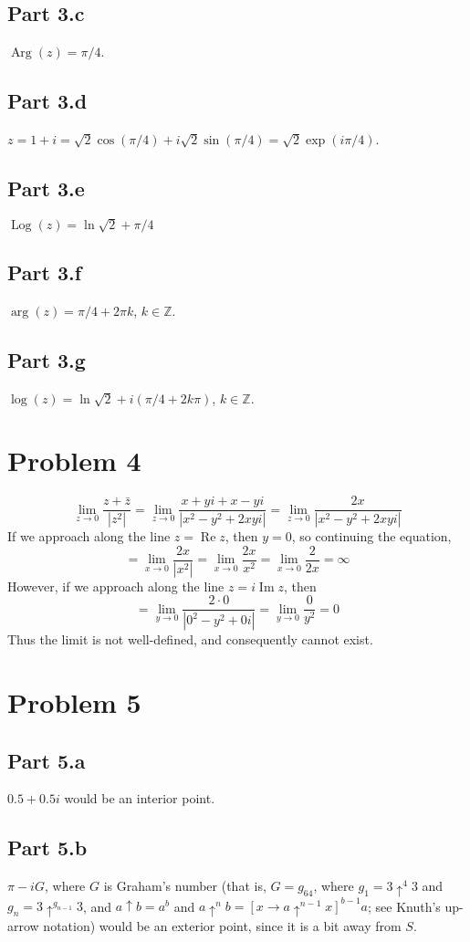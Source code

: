 \documentclass{article}
\theoremstyle{definition}
\newcommand{\Z}{\mathbb{Z}}
\newcommand{\p}[1]{\left(#1\right)}
\newcommand{\abs}[1]{\left|#1\right|}
\begin{document}
\subsection{Part 3.c}
$\operatorname{Arg}(z) = \pi/4$.
\subsection{Part 3.d}
$z = 1+i = \sqrt{2} \cos(\pi/4) + i \sqrt{2} \sin(\pi/4) 
= \sqrt{2} \exp\p{i\pi/4}$.
\subsection{Part 3.e}
$\operatorname{Log}(z) = \ln\sqrt{2}+\pi/4$
\subsection{Part 3.f}
$\arg(z)=\pi/4+2\pi k$, $k\in \Z$.
\subsection{Part 3.g}
$\log(z) = \ln\sqrt{2} + i(\pi/4 + 2 k \pi)$, $k \in \Z$.

\section{Problem 4}

\[
\lim_{z\to 0} \frac{z+\bar{z}}{\abs{z^2}}
= \lim_{z\to 0} \frac{x+yi + x-yi}{\abs{x^2 - y^2 + 2xyi}}
= \lim_{z\to 0} \frac{2x}{\abs{x^2-y^2 + 2xyi}}
\]
If we approach along the line $z=\operatorname{Re} z$, then
$y=0$, so continuing the equation,
\[ 
= \lim_{x \to 0} \frac{2x}{\abs{x^2}} 
= \lim_{x \to 0} \frac{2x}{x^2}
= \lim_{x \to 0} \frac{2}{2x}
= \infty
\]
However, if we approach along the line $z = i \operatorname{Im} z$, then
\[ 
= \lim_{y \to 0} \frac{2 \cdot 0}{\abs{0^2-y^2+0i}}
= \lim_{y \to 0} \frac{0}{y^2}
=0
\]
Thus the limit is not well-defined, and consequently cannot exist.

\section{Problem 5}
\subsection{Part 5.a}
$0.5 + 0.5 i$ would be an interior point.
\subsection{Part 5.b}
$\pi - iG$, where $G$ is Graham's number (that is, $G=g_{64}$,
where $g_1 = 3 \uparrow^4 3$ and $g_n = 3\uparrow^{g_{n-1}} 3$, 
and $a \uparrow b = a^b$ and 
$a \uparrow^n b = [x \to a \uparrow^{n-1} x]^{b-1} a$; see Knuth's
up-arrow notation)
would be an exterior point, since it is a bit away from $S$.
\end{document}
